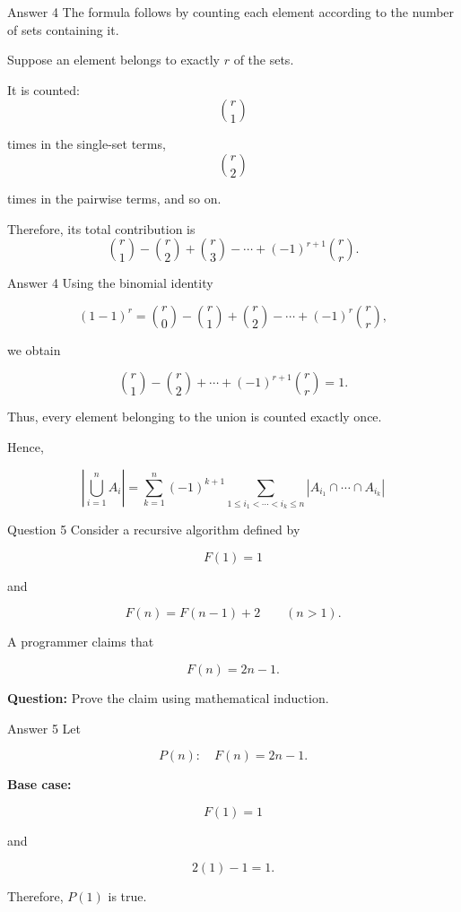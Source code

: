 \begin{frame}{Answer 4}
The formula follows by counting each element according to the number of
sets containing it.

Suppose an element belongs to exactly $r$ of the sets.

It is counted:
$$
\binom{r}{1}
$$

times in the single-set terms,
$$
\binom{r}{2}
$$

times in the pairwise terms, and so on.

Therefore, its total contribution is
$$
\binom{r}{1}
-\binom{r}{2}
+\binom{r}{3}
-\cdots
+(-1)^{r+1}\binom{r}{r}.
$$

\end{frame}

\begin{frame}{Answer 4}
Using the binomial identity

$$
(1-1)^r
=
\binom{r}{0}
-\binom{r}{1}
+\binom{r}{2}
-\cdots
+(-1)^r\binom{r}{r},
$$

we obtain

$$
\binom{r}{1}
-\binom{r}{2}
+\cdots
+(-1)^{r+1}\binom{r}{r}
=1.
$$

Thus, every element belonging to the union is counted exactly once.

Hence,

$$
\boxed{
\left|\bigcup_{i=1}^{n}A_i\right|
=
\sum_{k=1}^{n}
(-1)^{k+1}
\sum_{1\le i_1<\cdots<i_k\le n}
|A_{i_1}\cap\cdots\cap A_{i_k}|
}
$$

\end{frame}


\begin{frame}{Question 5}
Consider a recursive algorithm defined by

$$
F(1)=1
$$

and

$$
F(n)=F(n-1)+2
\qquad(n>1).
$$

A programmer claims that

$$
F(n)=2n-1.
$$

\textbf{Question:} Prove the claim using mathematical induction.
\end{frame}

\begin{frame}{Answer 5}
Let

$$
P(n):\quad F(n)=2n-1.
$$

\textbf{Base case:}

$$
F(1)=1
$$

and

$$
2(1)-1=1.
$$

Therefore, $P(1)$ is true.
\end{frame}

